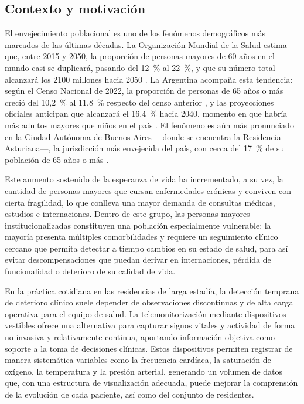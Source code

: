 \documentclass[12pt,a4paper]{article}
\begin{document}
    \subsection{Contexto y motivación}
    
    El envejecimiento poblacional es uno de los fenómenos demográficos más marcados de las últimas décadas. La Organización Mundial de la Salud estima que, entre 2015 y 2050, la proporción de personas mayores de 60 años en el mundo casi se duplicará, pasando del 12~\% al 22~\%, y que su número total alcanzará los 2100 millones hacia 2050 \cite{who_ageing}. La Argentina acompaña esta tendencia: según el Censo Nacional de 2022, la proporción de personas de 65 años o más creció del 10,2~\% al 11,8~\% respecto del censo anterior \cite{indec_censo2022}, y las proyecciones oficiales anticipan que alcanzará el 16,4~\% hacia 2040, momento en que habría más adultos mayores que niños en el país \cite{indec_proyecciones}. El fenómeno es aún más pronunciado en la Ciudad Autónoma de Buenos Aires —donde se encuentra la Residencia Asturiana—, la jurisdicción más envejecida del país, con cerca del 17~\% de su población de 65 años o más \cite{indec_censo2022}.
    
    Este aumento sostenido de la esperanza de vida ha incrementado, a su vez, la cantidad de personas mayores que cursan enfermedades crónicas y conviven con cierta fragilidad, lo que conlleva una mayor demanda de consultas médicas, estudios e internaciones. Dentro de este grupo, las personas mayores institucionalizadas constituyen una población especialmente vulnerable: la mayoría presenta múltiples comorbilidades y requiere un seguimiento clínico cercano que permita detectar a tiempo cambios en su estado de salud, para así evitar descompensaciones que puedan derivar en internaciones, pérdida de funcionalidad o deterioro de su calidad de vida.
 
    En la práctica cotidiana en las residencias de larga estadía, la detección temprana de deterioro clínico suele depender de observaciones discontinuas y de alta carga operativa para el equipo de salud. La telemonitorización mediante dispositivos vestibles ofrece una alternativa para capturar signos vitales y actividad de forma no invasiva y relativamente continua, aportando información objetiva como soporte a la toma de decisiones clínicas. Estos dispositivos permiten registrar de manera sistemática variables como la frecuencia cardíaca, la saturación de oxígeno, la temperatura y la presión arterial, generando un volumen de datos que, con una estructura de visualización adecuada, puede mejorar la comprensión de la evolución de cada paciente, así como del conjunto de residentes.
    
\end{document}
